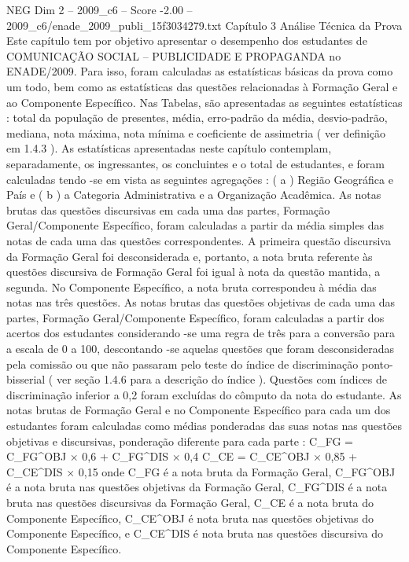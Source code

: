 \begin{textsample}{NEG Dim 2 – 2009\_c6 – Score -2.00 – 2009\_c6/enade\_2009\_publi\_15f3034279.txt}  \label{ex:f2_neg_137}
Capítulo 3 Análise Técnica da Prova Este capítulo tem por objetivo apresentar o desempenho dos estudantes de COMUNICAÇÃO SOCIAL – PUBLICIDADE E PROPAGANDA no ENADE/2009.
Para isso, foram calculadas as estatísticas básicas da prova como um todo, bem como as estatísticas das questões relacionadas à Formação Geral e ao Componente Específico.
Nas Tabelas, são apresentadas as seguintes estatísticas : total da população de presentes, média, erro-padrão da média, desvio-padrão, mediana, nota máxima, nota mínima e coeficiente de assimetria ( ver definição em 1.4.3 ).
As estatísticas apresentadas neste capítulo contemplam, separadamente, os ingressantes, os concluintes e o total de estudantes, e foram calculadas tendo -se em vista as seguintes agregações : ( a ) Região Geográfica e País e ( b ) a Categoria Administrativa e a Organização Acadêmica.
As notas brutas das questões discursivas em cada uma das partes, Formação Geral/Componente Específico, foram calculadas a partir da média simples das notas de cada uma das questões correspondentes.
A primeira questão discursiva da Formação Geral foi desconsiderada e, portanto, a nota bruta referente às questões discursiva de Formação Geral foi igual à nota da questão mantida, a segunda.
No Componente Específico, a nota bruta correspondeu à média das notas nas três questões.
As notas brutas das questões objetivas de cada uma das partes, Formação Geral/Componente Específico, foram calculadas a partir dos acertos dos estudantes considerando -se uma regra de três para a conversão para a escala de 0 a 100, descontando -se aquelas questões que foram desconsideradas pela comissão ou que não passaram pelo teste do índice de discriminação ponto-bisserial ( ver seção 1.4.6 para a descrição do índice ).
Questões com índices de discriminação inferior a 0,2 foram excluídas do cômputo da nota do estudante.
As notas brutas de Formação Geral e no Componente Específico para cada um dos estudantes foram calculadas como médias ponderadas das suas notas nas questões objetivas e discursivas, ponderação diferente para cada parte : C\_FG = C\_FG\textasciicircum{}OBJ × 0,6 + C\_FG\textasciicircum{}DIS × 0,4 C\_CE = C\_CE\textasciicircum{}OBJ × 0,85 + C\_CE\textasciicircum{}DIS × 0,15 onde C\_FG é a nota bruta da Formação Geral, C\_FG\textasciicircum{}OBJ é a nota bruta nas questões objetivas da Formação Geral, C\_FG\textasciicircum{}DIS é a nota bruta nas questões discursivas da Formação Geral, C\_CE é a nota bruta do Componente Específico, C\_CE\textasciicircum{}OBJ é nota bruta nas questões objetivas do Componente Específico, e C\_CE\textasciicircum{}DIS é nota bruta nas questões discursiva do Componente Específico.

\end{textsample}
